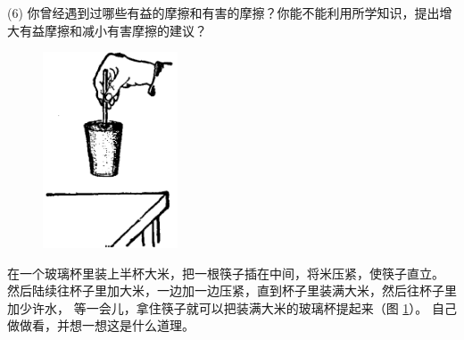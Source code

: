 (6) 你曾经遇到过哪些有益的摩擦和有害的摩擦？你能不能利用所学知识，提出增大有益摩擦和减小有害摩擦的建议？




\begin{figure}
    \centering
    \includegraphics[width=4cm]{../pic/czwl1-ch3-16}
    \caption{}\label{fig:3-16}
\end{figure}

在一个玻璃杯里装上半杯大米，把一根筷子插在中间，将米压紧，使筷子直立。
然后陆续往杯子里加大米，一边加一边压紧，直到杯子里装满大米，然后往杯子里加少许水，
等一会儿，拿住筷子就可以把装满大米的玻璃杯提起来（图 \ref{fig:3-16}）。
自己做做看，并想一想这是什么道理。


